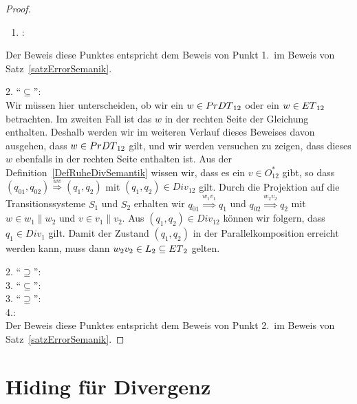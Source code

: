 \begin{proof}
  ~
  \begin{enumerate}
    \item \hspace{-0.2cm}:
  \end{enumerate}
  \vspace{-0.3cm}
  Der Beweis diese Punktes entspricht dem Beweis von Punkt 1.\ im Beweis von
  Satz~\ref{satzErrorSemanik}.

  2. ``$\subseteq$'':\\
  Wir müssen hier unterscheiden, ob wir ein $w\in PrDT{}_{12}$ oder ein $w\in
  ET{}_{12}$ betrachten. Im zweiten Fall ist das $w$ in der rechten Seite der
  Gleichung enthalten. Deshalb werden wir im weiteren Verlauf dieses Beweises
  davon ausgehen, dass $w\in PrDT{}_{12}$ gilt, und wir werden versuchen zu
  zeigen, dass dieses $w$ ebenfalls in der rechten Seite enthalten ist. Aus der
  Definition~\ref{DefRuheDivSemantik} wissen wir, dass es ein $v\in O^*_{12}$
  gibt, so dass $(q_{01},q_{02}) \overset{wv}{\Rightarrow} (q_1,q_2)$ mit
  $(q_1,q_2)\in Div_{12}$ gilt. Durch die Projektion auf die Transitionssysteme
  $S_1$ und $S_2$ erhalten wir $q_{01} \overset{w_1v_1}{\Rightarrow} q_1$ und
  $q_{02} \overset{w_2v_2}{\Rightarrow} q_2$ mit $w\in w_1\|w_2$ und $v\in
  v_1\|v_2$. Aus $(q_1,q_2)\in Div_{12}$ können wir folgern, dass \oBdA{}
  $q_1\in Div_1$ gilt. Damit der Zustand $(q_1,q_2)$ in der Parallelkomposition
  erreicht werden kann, muss dann $w_2v_2\in L_2\subseteq ET{}_2$ gelten.

  2. ``$\supseteq$'':\\

  3. ``$\subseteq$'':\\

  3. ``$\supseteq$'':\\

  4.:\\
  Der Beweis diese Punktes entspricht dem Beweis von Punkt 2.\ im Beweis von
  Satz~\ref{satzErrorSemanik}.
\end{proof}

\section{Hiding für Divergenz}
